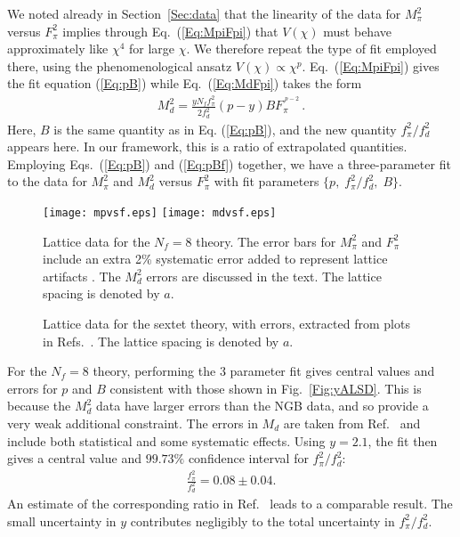 \documentclass[a4paper,11pt]{article}
\newcommand{\beqs}{\begin{eqnarray}}
\newcommand{\eeqs}{\end{eqnarray}}
\begin{document}
We noted already in Section~\ref{Sec:data} that the linearity of the data for $M_{\pi}^2$ versus $F_{\pi}^2$ implies through Eq.~(\ref{Eq:MpiFpi}) that $V(\chi)$ must behave approximately like $\chi^4$ for large $\chi$. We therefore repeat the type of fit employed there, using the phenomenological ansatz $V(\chi) \propto \chi^p$.  Eq.~(\ref{Eq:MpiFpi}) gives the fit equation (\ref{Eq:pB}) while Eq.~(\ref{Eq:MdFpi}) takes the form
\beqs
M^2_d = \frac{yN_ff^2_\pi}{2f^2_d}(p-y)BF_\pi^{^{\;\scriptstyle{p-2}}}\,.
\label{Eq:pBf}
\eeqs
Here, $B$ is the same quantity as in Eq. (\ref{Eq:pB}), and the new quantity $f_{\pi}^2/ f_d^2$ appears here. In our framework, this is a ratio of extrapolated quantities. Employing Eqs.~(\ref{Eq:pB}) and (\ref{Eq:pBf}) together, we have a three-parameter fit to the data for $M_{\pi}^2$ and $M_d^2$ versus $F_{\pi}^2$ with fit parameters $\{p,\; f_\pi^2/f_d^2,\; B\}$.

\begin{figure}[h]
	\centering
	\texttt{[image: mpvsf.eps]} \qquad
	\texttt{[image: mdvsf.eps]}
	\caption{Lattice data for the $N_f=8$ theory. The error bars for $M^2_\pi$ and $F^2_\pi$ include an extra 2\% systematic error added to represent lattice artifacts \cite{LSD}. The $M^2_d$ errors are discussed in the text. The lattice spacing is denoted by $a$.}
	\label{Fig:M8}
\end{figure}
\begin{figure}[h]
	\centering
	 \qquad
	\caption{Lattice data for the sextet theory, with errors, extracted from plots in Refs.~\cite{FHKMNW,FHKMNW2,FHKNSW}. The lattice spacing is denoted by $a$.}
	\label{Fig:MS}
\end{figure}

For the $N_f=8$ theory, performing the 3 parameter fit gives central values and errors for $p$ and $B$ consistent with those shown in Fig.~\ref{Fig:yALSD}. This is because the $M^2_d$ data have larger errors than the NGB data, and so provide a very weak additional constraint. The errors in $M_d$ are taken from Ref.~\cite{LSD} and include both statistical and some systematic effects. Using $y=2.1$, the fit then gives a central value and $99.73\%$ confidence interval for $f^2_\pi/f^2_d$:
\beqs
\frac{f^2_\pi}{f^2_d} = 0.08 \pm 0.04.
\label{Eq:Ratio8}
\eeqs
An estimate of the corresponding ratio in Ref.~\cite{LatKMI2} leads to a comparable result. The small uncertainty in $y$ contributes negligibly to the total uncertainty in $f^2_\pi/f^2_d$.
\end{document}

